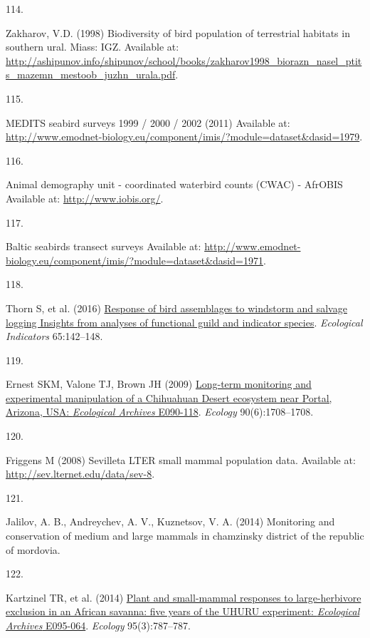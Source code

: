 \documentclass{article}
\newlength{\cslhangindent}
\newlength{\csllabelwidth}
\newlength{\cslentryspacingunit} %
\newenvironment{CSLReferences}[2] %
 {%
  \setlength{\parindent}{0pt}
  \ifodd #1
  \let\oldpar\par
  \def\par{\hangindent=\cslhangindent\oldpar}
  \fi
  \setlength{\parskip}{#2\cslentryspacingunit}
 }%
 {}
\newcommand{\CSLLeftMargin}[1]{\parbox[t]{\csllabelwidth}{#1}}
\newcommand{\CSLRightInline}[1]{\parbox[t]{\linewidth - \csllabelwidth}{#1}\break}
\begin{document}
\begin{CSLReferences}{0}{0}
\leavevmode{}%
\CSLLeftMargin{114. }%
\CSLRightInline{Zakharov, V.D. (1998) Biodiversity of bird population of
terrestrial habitats in southern ural. Miass: IGZ. Available at:
\url{http://ashipunov.info/shipunov/school/books/zakharov1998_biorazn_nasel_ptits_mazemn_mestoob_juzhn_urala.pdf}.}

\leavevmode{}%
\CSLLeftMargin{115. }%
\CSLRightInline{MEDITS seabird surveys 1999 / 2000 / 2002 (2011)
Available at:
\url{http://www.emodnet-biology.eu/component/imis/?module=dataset\&dasid=1979}.}

\leavevmode{}%
\CSLLeftMargin{116. }%
\CSLRightInline{Animal demography unit - coordinated waterbird counts
(CWAC) - AfrOBIS Available at: \url{http://www.iobis.org/}.}

\leavevmode{}%
\CSLLeftMargin{117. }%
\CSLRightInline{Baltic seabirds transect surveys Available at:
\url{http://www.emodnet-biology.eu/component/imis/?module=dataset\&dasid=1971}.}

\leavevmode{}%
\CSLLeftMargin{118. }%
\CSLRightInline{Thorn S, et al. (2016)
\href{https://doi.org/10.1016/j.ecolind.2015.06.033}{Response of bird
assemblages to windstorm and salvage logging {\textemdash} Insights from
analyses of functional guild and indicator species}. \emph{Ecological
Indicators} 65:142--148.}

\leavevmode{}%
\CSLLeftMargin{119. }%
\CSLRightInline{Ernest SKM, Valone TJ, Brown JH (2009)
\href{https://doi.org/10.1890/08-1222.1}{Long-term monitoring and
experimental manipulation of a Chihuahuan Desert ecosystem near Portal,
Arizona, USA: {\emph{Ecological Archives}} E090-118}. \emph{Ecology}
90(6):1708--1708.}

\leavevmode{}%
\CSLLeftMargin{120. }%
\CSLRightInline{Friggens M (2008) Sevilleta LTER small mammal population
data. Available at: \url{http://sev.lternet.edu/data/sev-8}.}

\leavevmode{}%
\CSLLeftMargin{121. }%
\CSLRightInline{Jalilov, A. B., Andreychev, A. V., Kuznetsov, V. A.
(2014) Monitoring and conservation of medium and large mammals in
chamzinsky district of the republic of mordovia.}

\leavevmode{}%
\CSLLeftMargin{122. }%
\CSLRightInline{Kartzinel TR, et al. (2014)
\href{https://doi.org/10.1890/13-1023R.1}{Plant and small-mammal
responses to large-herbivore exclusion in an African savanna: five years
of the UHURU experiment: {\emph{Ecological Archives}} E095-064}.
\emph{Ecology} 95(3):787--787.}


\end{CSLReferences}
\end{document}
